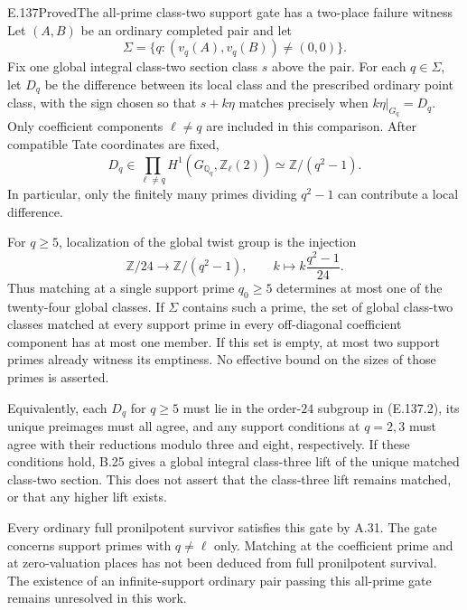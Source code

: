 \begin{result}{E.137}{Proved}{The all-prime class-two support gate has a two-place failure witness}
Let $(A,B)$ be an ordinary completed pair and let
\[
 \Sigma=\{q:(v_q(A),v_q(B))\ne(0,0)\}.
\]
Fix one global integral class-two section class $s$ above the pair.
For each $q\in\Sigma$, let $D_q$ be the difference between its
local class and the prescribed ordinary point class, with the sign
chosen so that $s+k\eta$ matches precisely when $k\eta|_{G_q}=D_q$.
Only coefficient components $\ell\ne q$ are included in this
comparison. After compatible Tate coordinates are fixed,
\[
 D_q\in\prod_{\ell\ne q}H^1(G_{\mathbb Q_q},\mathbb Z_\ell(2))
       \simeq \mathbb Z/(q^2-1).
 \tag{E.137.1}
\]
In particular, only the finitely many primes dividing $q^2-1$
can contribute a local difference.

For $q\ge5$, localization of the global twist group is the injection
\[
 \mathbb Z/24\longrightarrow\mathbb Z/(q^2-1),\qquad
 k\longmapsto k\frac{q^2-1}{24}.
 \tag{E.137.2}
\]
Thus matching at a single support prime $q_0\ge5$ determines
at most one of the twenty-four global classes. If $\Sigma$
contains such a prime, the set of global class-two classes matched
at every support prime in every off-diagonal coefficient component
has at most one member. If this set is empty, at most two support
primes already witness its emptiness. No effective bound on the
sizes of those primes is asserted.

Equivalently, each $D_q$ for $q\ge5$ must lie in the order-$24$
subgroup in (E.137.2), its unique preimages must all agree, and
any support conditions at $q=2,3$ must agree with their reductions
modulo three and eight, respectively. If these conditions hold,
B.25 gives a global integral class-three lift of the unique matched
class-two section. This does not assert that the class-three lift
remains matched, or that any higher lift exists.

Every ordinary full pronilpotent survivor satisfies this gate by
A.31. The gate concerns support primes with $q\ne\ell$ only.
Matching at the coefficient prime and at zero-valuation places
has not been deduced from full pronilpotent survival.
The existence of an infinite-support ordinary pair passing this
all-prime gate remains unresolved in this work.
\end{result}
